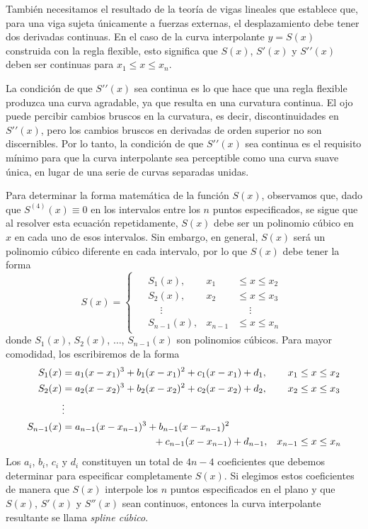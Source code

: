 También necesitamos el resultado de la teoría de vigas lineales que establece que, para una viga sujeta únicamente a fuerzas externas, el desplazamiento debe tener dos derivadas continuas. En el caso de la curva interpolante $y = S(x)$ construida con la regla flexible, esto significa que $S(x)$, $S′(x)$ y $S′′(x)$ deben ser continuas para $x_1 \leq x \leq x_n$.

La condición de que $S′′(x)$ sea continua es lo que hace que una regla flexible produzca una curva agradable, ya que resulta en una curvatura continua. El ojo puede percibir cambios bruscos en la curvatura, es decir, discontinuidades en $S′′(x)$, pero los cambios bruscos en derivadas de orden superior no son discernibles. Por lo tanto, la condición de que $S′′(x)$ sea continua es el requisito mínimo para que la curva interpolante sea perceptible como una curva suave única, en lugar de una serie de curvas separadas unidas.

Para determinar la forma matemática de la función $S(x)$, observamos que, dado que $S^{(4)}(x) \equiv 0$ en los intervalos entre los $n$ puntos especificados, se sigue que al resolver esta ecuación repetidamente, $S(x)$ debe ser un polinomio cúbico en $x$ en cada uno de esos intervalos. Sin embargo, en general, $S(x)$ será un polinomio cúbico diferente en cada intervalo, por lo que $S(x)$ debe tener la forma
\begin{equation}
    S(x) = \begin{cases}
        \begin{aligned}
            & S_1(x), & x_1 & \leq x \leq x_2 \\
            & S_2(x), & x_2 & \leq x \leq x_3 \\
            & \phantom{SS} \vdots & & \;\quad \vdots \\
            & S_{n-1}(x), & x_{n-1} & \leq x \leq x_n
        \end{aligned}
    \end{cases} \label{eq:S_interpola}
\end{equation}
donde $S_1(x)$, $S_2(x)$, $\dots$, $S_{n-1}(x)$ son polinomios cúbicos. Para mayor comodidad, los escribiremos de la forma
\begin{align*}
    S_1(x) & = a_1(x - x_1)^3 + b_1(x - x_1)^2 + c_1(x - x_1) + d_1, & x_1 & \leq x \leq x_2 \\
    S_2(x) & = a_2(x - x_2)^3 + b_2(x - x_2)^2 + c_2(x - x_2) + d_2, & x_2 & \leq x \leq x_3 \\
    & \vdots & & \\
    S_{n-1}(x) & = a_{n-1}(x - x_{n-1})^3 + b_{n-1}(x - x_{n-1})^2 & & \\
    & \hspace{3.25cm} + c_{n-1}(x - x_{n-1}) + d_{n-1}, & x_{n-1} & \leq x \leq x_n
\end{align*}
Los $a_i$, $b_i$, $c_i$ y $d_i$ constituyen un total de $4n - 4$ coeficientes que debemos determinar para especificar completamente $S(x)$. Si elegimos estos coeficientes de manera que $S(x)$ interpole los $n$ puntos especificados en el plano y que $S(x)$, $S'(x)$ y $S''(x)$ sean continuos, entonces la curva interpolante resultante se llama \emph{spline cúbico}.

